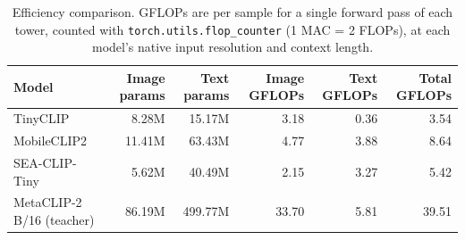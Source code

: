 \begin{table}[h!]
\centering
\begin{tabular}{l r r r r r}
\toprule
\textbf{Model} & \textbf{Image params} & \textbf{Text params}
  & \textbf{Image GFLOPs} & \textbf{Text GFLOPs} & \textbf{Total GFLOPs} \\
\midrule
TinyCLIP & 8.28M & 15.17M & 3.18 & 0.36 & 3.54 \\
MobileCLIP2 & 11.41M & 63.43M & 4.77 & 3.88 & 8.64 \\
SEA-CLIP-Tiny & 5.62M & 40.49M & 2.15 & 3.27 & 5.42 \\
MetaCLIP-2 B/16 (teacher) & 86.19M & 499.77M & 33.70 & 5.81 & 39.51 \\
\bottomrule
\end{tabular}
\caption{Efficiency comparison. GFLOPs are per sample for a single forward pass of each tower, counted with \texttt{torch.utils.flop\_counter} (1 MAC = 2 FLOPs), at each model's native input resolution and context length.}
\label{tab:efficiency}
\end{table}
